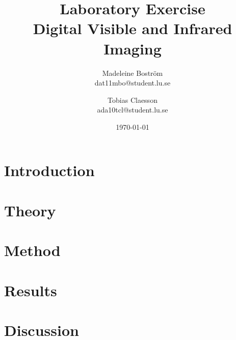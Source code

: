 \documentclass[a4paper]{article}
\begin{document}
\title{Laboratory Exercise \\Digital Visible and Infrared Imaging}
\author{
	Madeleine Bostr\"{o}m\\
	dat11mbo@student.lu.se
	\and
	Tobias Claesson\\
	ada10tcl@student.lu.se
}
\date{\today}
\maketitle


\section{Introduction}


\section{Theory}


\section{Method}


\section{Results}


\section{Discussion}


\clearpage

\end{document}
